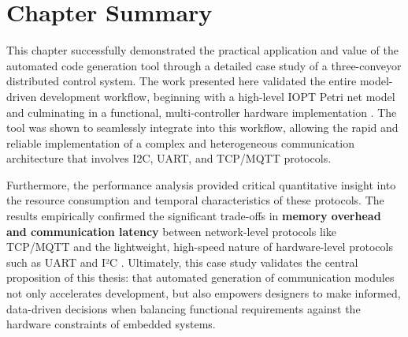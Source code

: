 \section{Chapter Summary}
\label{sec:case_study_summary}

This chapter successfully demonstrated the practical application and value of the automated code generation tool through a detailed case study of a three-conveyor distributed control system. The work presented here validated the entire model-driven development workflow, beginning with a high-level IOPT Petri net model and culminating in a functional, multi-controller hardware implementation . The tool was shown to seamlessly integrate into this workflow, allowing the rapid and reliable implementation of a complex and heterogeneous communication architecture that involves I2C, UART, and TCP/MQTT protocols.

Furthermore, the performance analysis provided critical quantitative insight into the resource consumption and temporal characteristics of these protocols. The results empirically confirmed the significant trade-offs in \textbf{memory overhead and communication latency} between network-level protocols like TCP/MQTT and the lightweight, high-speed nature of hardware-level protocols such as UART and I²C . Ultimately, this case study validates the central proposition of this thesis: that automated generation of communication modules not only accelerates development, but also empowers designers to make informed, data-driven decisions when balancing functional requirements against the hardware constraints of embedded systems.